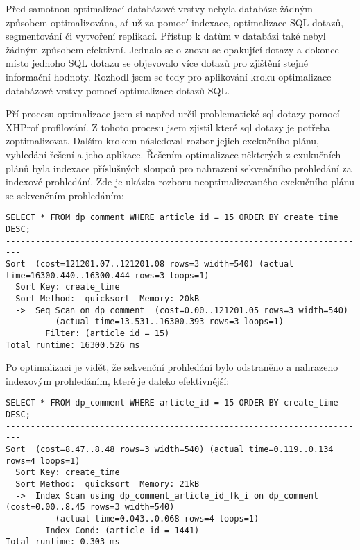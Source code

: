 \documentclass[12pt]{article}
\begin{document}
\label{sec:optim-database}
Před samotnou optimalizací databázové vrstvy nebyla databáze žádným způsobem optimalizována, ať už za pomocí indexace, optimalizace SQL dotazů, segmentování či vytvoření replikací. Přístup k datům v databázi také nebyl žádným způsobem efektivní. Jednalo se o znovu se opakující dotazy a dokonce místo jednoho SQL dotazu se objevovalo více dotazů pro zjištění stejné informační hodnoty. Rozhodl jsem se tedy pro aplikování kroku optimalizace databázové vrstvy pomocí optimalizace dotazů SQL.

Pří procesu optimalizace jsem si napřed určil problematické sql dotazy pomocí XHProf profilování. Z tohoto procesu jsem zjistil které sql dotazy je potřeba zoptimalizovat. Dalším krokem následoval rozbor jejich exekučního plánu, vyhledání řešení a jeho aplikace. Řešením optimalizace některých z exukučních plánů byla indexace příslušných sloupců pro nahrazení sekvenčního prohledání za indexové prohledání. Zde je ukázka rozboru neoptimalizovaného exekučního plánu se sekvenčním prohledáním:

\begin{scriptsize}
\begin{verbatim}
SELECT * FROM dp_comment WHERE article_id = 15 ORDER BY create_time DESC;
-------------------------------------------------------------------------
Sort  (cost=121201.07..121201.08 rows=3 width=540) (actual time=16300.440..16300.444 rows=3 loops=1)
  Sort Key: create_time
  Sort Method:  quicksort  Memory: 20kB
  ->  Seq Scan on dp_comment  (cost=0.00..121201.05 rows=3 width=540) 
          (actual time=13.531..16300.393 rows=3 loops=1)
        Filter: (article_id = 15)
Total runtime: 16300.526 ms
\end{verbatim}
\end{scriptsize}

Po optimalizaci je vidět, že sekvenční prohledání bylo odstraněno a nahrazeno indexovým prohledáním, které je daleko efektivnější:

\begin{scriptsize}
\begin{verbatim}
SELECT * FROM dp_comment WHERE article_id = 15 ORDER BY create_time DESC;
-------------------------------------------------------------------------
Sort  (cost=8.47..8.48 rows=3 width=540) (actual time=0.119..0.134 rows=4 loops=1)
  Sort Key: create_time
  Sort Method:  quicksort  Memory: 21kB
  ->  Index Scan using dp_comment_article_id_fk_i on dp_comment  (cost=0.00..8.45 rows=3 width=540) 
          (actual time=0.043..0.068 rows=4 loops=1)
        Index Cond: (article_id = 1441)
Total runtime: 0.303 ms
\end{verbatim}
\end{scriptsize}
\end{document}
